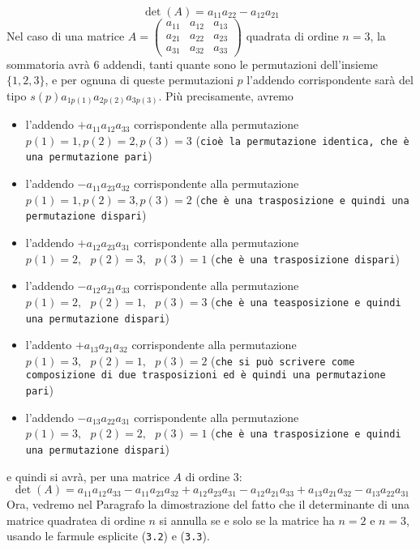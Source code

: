\documentclass{book}
\begin{document}
       \begin{equation}
		\det(A)=a_{11}a_{22}-a_{12}a_{21}
       \end{equation}
       Nel caso di una matrice $A= \begin{pmatrix}
                                     a_{11} & a_{12} & a_{13}\\
                                     a_{21} & a_{22} & a_{23}\\
                                     a_{31} & a_{32} & a_{33}
                                   \end{pmatrix}$ quadrata di ordine $n = 3$, la sommatoria avrà 6 addendi, tanti quante sono le permutazioni dell'insieme $\{1,2,3\}$, e per ognuna di queste permutazioni $p$ l'addendo corrispondente sarà del tipo $s(p)a_{1p(1)}a_{2p(2)}a_{3p(3)}$. Più precisamente, avremo
\begin{itemize}
\item l'addendo $+a_{11}a_{12}a_{33}$ corrispondente alla permutazione $p(1) = 1, p(2) =2, p(3) =3$ ({\tt cioè la permutazione identica, che è una permutazione pari})
\item l'addendo $-a_{11}a_{23}a_{32}$ corrispondente alla permutazione $p(1) = 1, p(2) =3, p(3) =2$ ({\tt che è una trasposizione e quindi una permutazione dispari})
\item l'addendo $+a_{12}a_{23}a_{31}$ corrispondente alla permutazione $p(1)=2,\text{ }p(2)=3,\text{ }p(3)=1$ ({\tt che è una trasposizione dispari})
\item l'addendo $-a_{12}a_{21}a_{33}$ corrispondente alla permutazione $p(1)=2,\text{ }p(2)=1,\text{ } p(3)=3$ ({\tt che è una teasposizione e quindi una permutazione dispari})
\item l'addento $+a_{13}a_{21}a_{32}$ corrispondente alla permutazione $p(1)=3,\text{ } p(2)=1,\text{ } p(3)=2$ ({\tt che si può scrivere come composizione di due trasposizioni ed è quindi una permutazione pari})
\item l'addendo $-a_{13}a_{22}a_{31}$ corrispondente alla permutazione $p(1) = 3,\text{ }p(2) = 2,\text{ }p(3)=1$ ({\tt che è una trasposizione e quindi una permutazione dispari})
\end{itemize}
e quindi si avrà, per una matrice $A$ di ordine 3: 
\begin{equation}
	\det(A)=a_{11}a_{12}a_{33}-a_{11}a_{23}a_{32}+a_{12}a_{23}a_{31}-a_{12}a_{21}a_{33}+a_{13}a_{21}a_{32}-a_{13}a_{22}a_{31}
\end{equation}
Ora, vedremo nel Paragrafo la dimostrazione del fatto che il determinante di una matrice quadratea di ordine $n$ si annulla se e solo se la matrice ha $n=2$ e $n=3$, usando le farmule esplicite ({\tt 3.2}) e ({\tt 3.3}).\\
\end{document}

